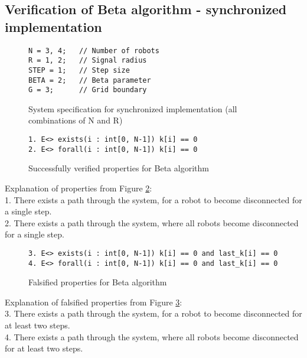 \subsection{Verification of Beta algorithm - synchronized implementation}
\begin{figure}[H]
\caption{System specification for synchronized implementation (all combinations of N and R)}
\label{fig:algorithm_synchronised_system}
\begin{lstlisting}[style=code]
N = 3, 4;   // Number of robots
R = 1, 2;   // Signal radius
STEP = 1;   // Step size
BETA = 2;   // Beta parameter
G = 3;      // Grid boundary
\end{lstlisting}
\end{figure}

\begin{figure}[H]
\caption{Successfully verified properties for Beta algorithm}
\label{fig:algorithm_synchronised_properties_true}
\begin{lstlisting}[style=code]
1. E<> exists(i : int[0, N-1]) k[i] == 0
2. E<> forall(i : int[0, N-1]) k[i] == 0
\end{lstlisting}    
\end{figure}

\noindent
Explanation of properties from Figure \ref{fig:algorithm_synchronised_properties_true}:\\
1. There exists a path through the system, for a robot to become disconnected for a single step.\\
2. There exists a path through the system, where all robots become disconnected for a single step.\\

\begin{figure}[H]
\caption{Falsified properties for Beta algorithm}
\label{fig:algorithm_synchronised_properties_false}
\begin{lstlisting}[style=code]
3. E<> exists(i : int[0, N-1]) k[i] == 0 and last_k[i] == 0
4. E<> forall(i : int[0, N-1]) k[i] == 0 and last_k[i] == 0
\end{lstlisting}    
\end{figure}

\noindent
Explanation of falsified properties from Figure \ref{fig:algorithm_synchronised_properties_false}:\\
3. There exists a path through the system, for a robot to become disconnected for at least two steps.\\
4. There exists a path through the system, where all robots become disconnected for at least two steps.\\